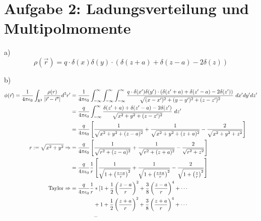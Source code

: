 \documentclass[11pt a4paper]{article}
\newcommand{\epsz}{\epsilon_0}
\begin{document}
\newpage
\setlength{\headheight}{0cm}

\section*{Aufgabe 2: Ladungsverteilung und Multipolmomente}
\par{a)}
\[
	\rho (\vec r) = q \cdot \delta(x) \delta(y) \cdot \left(
	\delta(z+a) + \delta(z-a) - 2\delta(z) \right)
\]
\par{b)}
\begin{align*}
	\phi(\vec r) = \frac1{4\pi\epsz} \int_{\mathbb{R}^3} 
	\frac{\rho(r)}{\vert \vec r - \vec r^\prime \vert} d^3r^\prime
	&= \frac{1}{4\pi\epsz} 
	\int_{-\infty}^\infty
	\int_{-\infty}^\infty
	\int_{-\infty}^\infty
	\frac{
	q \cdot \delta(x^\prime) \delta(y^\prime) \cdot \left(
	\delta(z^\prime+a) + \delta(z^\prime-a) - 2\delta(z^\prime) \right)}
	{\sqrt{(x-x^\prime)^2 +(y-y^\prime)^2 + (z-z^\prime)^2}}
	\ dx^\prime dy^\prime dz^\prime \\
	&= \frac{q}{4\pi\epsz} 
	\int_{-\infty}^\infty 
	\frac{\delta(z^\prime+a) + \delta(z^\prime-a) - 2\delta(z^\prime)}
	{\sqrt{x^2 + y^2 + (z - z^\prime)^2}}
	\ dz^\prime \\
	&= \frac{q}{4\pi\epsz} \left[
		\frac{1}{\sqrt{x^2 + y^2 + (z-a)^2}} + 
		\frac{1}{\sqrt{x^2 + y^2 + (z+a)^2}} -
		\frac{2}{\sqrt{x^2 + y^2 + z^2}}  
	\right] \\
	r := \sqrt{x^2 + y^2}
	\Rightarrow
	&= \frac{q}{4\pi\epsz} \left[
		\frac{1}{\sqrt{r^2 + (z-a)^2}} + 
		\frac{1}{\sqrt{r^2 + (z+a)^2}} -
		\frac{2}{\sqrt{r^2 + z^2}}  
	\right] \\
	&= \frac{q}{4\pi\epsz} \frac1r \left[
		\frac{1}{\sqrt{1 + \left( \frac{z-a}{r} \right)^2}} +
		\frac{1}{\sqrt{1 + \left( \frac{z+a}{r} \right)^2}} -
		\frac{2}{\sqrt{1 + \left( \frac{z}{r} \right)^2}} 
	\right] \\
	\text{Taylor} \Rightarrow
	&= \frac{q}{4\pi\epsz} \frac1r * [
			1 + \frac{1}{2} \left(\frac{z-a}{r}\right)^2
			+ \frac{3}{8} \left(\frac{z-a}{r}\right)^4
			+  \dotsb \\
			&\hspace{1.49cm} +
			1 + \frac{1}{2} \left(\frac{z+a}{r}\right)^2
			+ \frac{3}{8} \left(\frac{z+a}{r}\right)^4
			+  \dotsb \\
			&\hspace{1.49cm} -

\end{align*}
\end{document}
